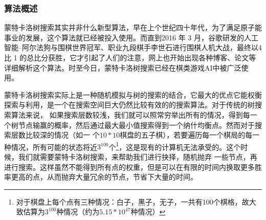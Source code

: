\documentclass[a4paper]{article}
\begin{document}
\begin{multicols}{2}
\subsubsection{算法概述}
蒙特卡洛树搜索其实并非什么新型算法，早在上个世纪四十年代，为了满足原子能事业的发展，这个算法就已经被投入使用\cite{k1}。而直到2016 年 3 月，谷歌研发的人工智能–阿尔法狗与围棋世界冠军、职业九段棋手李世石进行围棋人机大战，最终以4 比 1 的总比分获胜，它才引起了人们的注意，网上也开始出现各种博客、论文等详细解析这个算法。时至今日，蒙特卡洛树搜索已经在棋类游戏AI中被广泛使用。\par
蒙特卡洛树搜索实际上是一种随机模拟与树的搜索的结合\cite{k2}，它最大的优点它能权衡探索与利用，是一个在搜索空间巨大仍然比较有效的的搜索算法。对于传统的树搜索算法来说，
如果搜索层数较浅，我们就可以照常穷举出所有的情况，得到每一个树节点输赢的概率，然后通过最大最小值搜索得到一个纳什均衡点。然而对于搜索层数比较深的情况（如一
个$10*10$棋盘的五子棋），若要遍历每一个棋局的每一种情况，所有可能的状态将近$3^{100}$个\footnote{对于棋盘上每个点有三种情况：白子，黑子，无子，一共有100个棋格，故大致估算为$3^{100}$种情况（约为$5.15*10^{47}$种情况）}，这是现有的计算机无法承受的。这个时候，我们就需要蒙特卡洛树搜索，来帮助我们进行抉择，随机抛弃
一些节点，再进行搜索。这样虽然不能得到所有点的权重，但是可以在有限的时间内换取更多胜率更高的点，从而抛弃大量冗余的节点，节省下大量的时间。

\end{multicols}
\end{document}
